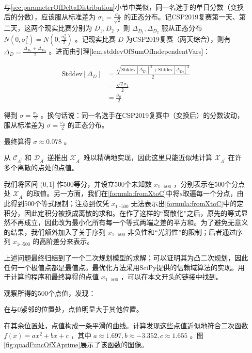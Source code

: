         与\ref{sec:parameterOfDeltaDistribution}小节中类似，同一名选手的单日分数（变换后的分数），应该服从标准差为 $\sigma_1=\frac {\sigma_0}{\sqrt 2}$ 的正态分布。记CSP2019复赛第一天、第二天，这两个现实比赛分别为 $D_1,D_2$ ，则 $\Delta_{D_1},\Delta_{D_2}$ 服从正态分布 $N(0,\sigma_1^2)=N(0,\frac {\sigma_0^2}{2})$ 。记现实比赛 $D$ 为CSP2019复赛（两天综合），则有 $\Delta_D=\frac{\Delta_{D_1}+\Delta_{D_2}}2$ 。进而由引理\ref{lem:stddevOfSumOfIndependentVars}：
        
        \begin{align*}
            \mathrm{Stddev}\left[\Delta_D\right]&=\frac{\sqrt{\mathrm{Stddev}\left[\Delta_{D_1}\right]^2+\mathrm{Stddev}\left[\Delta_{D_2}\right]^2}}2 \\
                                                &=\frac{\sqrt{2}\sigma_1}{2} \\
                                                &=\frac{\sigma_0}{2}
        \end{align*}
        
        得到 $\sigma=\frac {\sigma_0}2$ 。换句话说：同一名选手在CSP2019复赛中（变换后）的分数波动，服从标准差为 $\sigma=\frac {\sigma_0}2$ 的正态分布。
        
        最终算得 $\sigma\approx0.078$ 。

        \vspace{1.5ex}

        从 $\mathcal{C}_{A^\prime}$ 和 $\mathcal{D}_{A^\prime}$ 逆推出 $\mathcal{X}_{A^\prime}$ 难以精确地实现，因此这里只能近似地计算 $\mathcal{X}_{A^\prime}$ 在许多个离散的点处的点值。

        我们将区间 $(0,1]$ 作500等分，并设立500个未知数 $x_{1\cdots 500}$ ，分别表示在500个分点处 $\mathcal{X}_{A^\prime}$ 的取值。另一方面，我们在\eqref{formula:fromXtoC}中将$s$取遍每一个分点，由此得到500个等式限制；注意到仅凭 $x_{1\cdots 500}$ 无法表示出\eqref{formula:fromXtoC}中的定积分，因此定积分被换成离散的求和。在作了这样的“离散化”之后，原先的等式显然不再成立，因此改为最小化所有每一个等式两端之差的平方和。为了避免无意义的结果，我们额外加入了关于序列 $x_{1\cdots 500}$ 非负性和“光滑性”的限制；后者通过序列 $x_{1\cdots 500}$ 的高阶差分来表示。

        上述问题最终归结到了一个二次规划模型的求解；可以证明其为凸二次规划，因此任何一个极值点都是最值点。最优化方法采用SciPy提供的信赖域算法的实现\cite{scipy_minimize}。用于计算的程序和最终算得的点值 $x_{1\cdots 500}$ ，可以在本文开头的链接中找到。

        观察所得的500个点值，发现：
        \begin{asparaenum}
            \item 在与0紧邻的位置处，点值明显大于其他位置。
            \item 在其余位置处，点值构成一条平滑的曲线。计算发现这些点值近似地符合二次函数 $f(x)=ax^2+bx+c$ ，其中 $a\approx 1.697,b\approx -3.352,c\approx 1.655$ 。图\ref{fig:quadFuncOfXAprime}展示了该函数的图像。
        \end{asparaenum}

